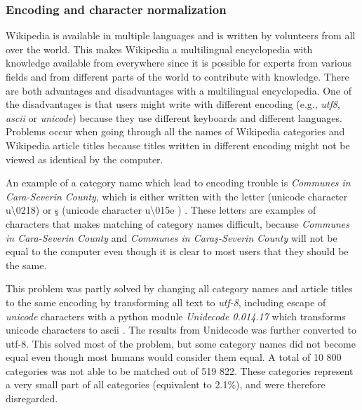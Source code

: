 \subsubsection{Encoding and character normalization}
Wikipedia is available in multiple languages and is written by volunteers from all over the world. This makes Wikipedia a multilingual encyclopedia with knowledge available from everywhere since it is possible for experts from various fields and from different parts of the world to contribute with knowledge. There are both advantages and disadvantages with a multilingual encyclopedia. One of the disadvantages is that users might write with different encoding (e.g., \emph{utf8}, \emph{ascii} or \emph{unicode}) because they use different keyboards and different languages. Problems occur when going through all the names of Wikipedia categories and Wikipedia article titles because titles written in different encoding might not be viewed as identical by the computer. 

An example of a category name which lead to encoding trouble is  \emph{Communes in Cara-Severin County}, which is either written with the letter \emph{} (unicode character u\textbackslash 0218) \cite{swithcomma} or \c{s} (unicode character u\textbackslash 015e )  \cite{swithcedilla}. These letters are examples of characters that makes matching of category names difficult, because \emph{Communes in Cara-Severin County} and \emph{Communes in Cara\c{s}-Severin County} will not be equal to the computer even though it is clear to most users that they should be the same. 

This problem was partly solved by changing all category names and article titles to the same encoding by transforming all text to \emph{utf-8}, including escape of \emph{unicode} characters with a python module \emph{Unidecode 0.014.17} which transforms unicode characters to ascii \cite{unidecode}. The results from Unidecode was further converted to utf-8. This solved most of the problem, but some category names did not become equal even though most humans would consider them equal. A total of 10 800 categories was not able to be matched out of 519 822. These categories represent a very small part of all categories  (equivalent to 2.1\%), and were therefore disregarded. 


